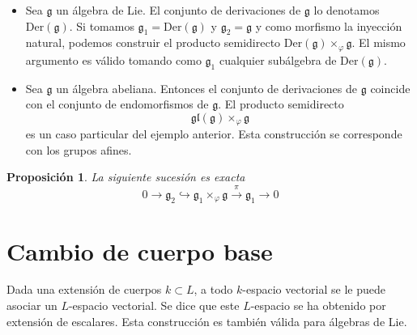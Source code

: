 \documentclass[a4paper,draft,12pt]{scrartcl}
\newtheorem{propo}[teo]{Proposición}%
\newcommand{\lto}{\longrightarrow}%
\begin{document}

\begin{itemize}

\item Sea $\mathfrak{g}$ un álgebra de Lie.  El conjunto de derivaciones de $\mathfrak{g}$ lo denotamos $\mathrm{Der}(\mathfrak{g})$. Si tomamos $\mathfrak{g}_1= \mathrm{Der}(\mathfrak{g})$ y $\mathfrak{g}_2=\mathfrak{g}$ y como morfismo la inyección natural, podemos construir el producto semidirecto $\mathrm{Der}(\mathfrak{g}) \times_\varphi \mathfrak{g}$.  El mismo argumento es válido tomando como $\mathfrak{g}_1$ cualquier subálgebra de $\mathrm{Der}(\mathfrak{g})$.

\item Sea $\mathfrak{g}$ un álgebra abeliana.  Entonces el conjunto de derivaciones de $\mathfrak{g}$ coincide con el conjunto de endomorfismos de $\mathfrak{g}$.  El producto semidirecto
$$
\mathfrak{gl}(\mathfrak{g}) \times_\varphi \mathfrak{g}
$$
es un caso particular del ejemplo anterior.  Esta construcción se corresponde con los grupos afines.

\end{itemize}

\begin{propo}

La siguiente sucesión es exacta
$$
0 \lto \mathfrak{g}_2 \hookrightarrow \mathfrak{g}_1 \times_\varphi \mathfrak{g} \stackrel{\pi}{\lto} \mathfrak{g}_1 \lto 0
$$

\end{propo}

\newpage

\section{Cambio de cuerpo base}

Dada una extensión de cuerpos $k \subset L$, a todo $k$-espacio vectorial se le puede asociar un $L$-espacio vectorial.  Se dice que este $L$-espacio se ha obtenido por extensión de escalares.  Esta construcción es también válida para álgebras de Lie.
\end{document}
